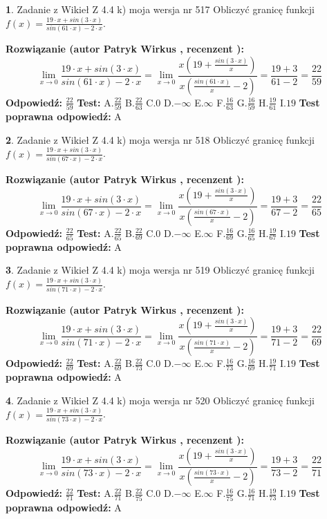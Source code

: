 \documentclass[12pt, a4paper]{article}
\theoremstyle{definition} %
\newtheorem{zad}{}
\newcommand{\zadStart}[1]{\begin{zad}#1\newline}
\newcommand{\zadStop}{\end{zad}}
\newcommand{\rozwStart}[2]{\noindent \textbf{Rozwiązanie (autor #1 , recenzent #2): }\newline}
\newcommand{\rozwStop}{\newline}
\newcommand{\odpStart}{\noindent \textbf{Odpowiedź:}\newline}
\newcommand{\odpStop}{\newline}
\newcommand{\testStart}{\noindent \textbf{Test:}\newline}
\newcommand{\testStop}{\newline}
\newcommand{\kluczStart}{\noindent \textbf{Test poprawna odpowiedź:}\newline}
\newcommand{\kluczStop}{\newline}
\begin{document}
\zadStart{Zadanie z Wikieł Z 4.4 k) moja wersja nr 517}
Obliczyć granicę funkcji $f(x)=\frac{19\cdot x +sin(3\cdot x)}{sin(61\cdot x) -2\cdot x}$.
\zadStop
\rozwStart{Patryk Wirkus}{}
$$\lim\limits_{x\to 0}\frac{19\cdot x +sin(3\cdot x)}{sin(61\cdot x) -2\cdot x}
=\lim\limits_{x\to 0}\frac{x(19+\frac{sin(3\cdot x)}{x})}{x(\frac{sin(61\cdot x)}{x}-2)}
=\frac{19+3}{61-2} = \frac{22}{59}$$
\rozwStop
\odpStart
$\frac{22}{59}$
\odpStop
\testStart
A.$\frac{22}{59}$
B.$\frac{22}{63}$
C.$0$
D.$-\infty$
E.$\infty$
F.$\frac{16}{63}$
G.$\frac{16}{59}$
H.$\frac{19}{61}$
I.$19$
\testStop
\kluczStart
A
\kluczStop



\zadStart{Zadanie z Wikieł Z 4.4 k) moja wersja nr 518}
Obliczyć granicę funkcji $f(x)=\frac{19\cdot x +sin(3\cdot x)}{sin(67\cdot x) -2\cdot x}$.
\zadStop
\rozwStart{Patryk Wirkus}{}
$$\lim\limits_{x\to 0}\frac{19\cdot x +sin(3\cdot x)}{sin(67\cdot x) -2\cdot x}
=\lim\limits_{x\to 0}\frac{x(19+\frac{sin(3\cdot x)}{x})}{x(\frac{sin(67\cdot x)}{x}-2)}
=\frac{19+3}{67-2} = \frac{22}{65}$$
\rozwStop
\odpStart
$\frac{22}{65}$
\odpStop
\testStart
A.$\frac{22}{65}$
B.$\frac{22}{69}$
C.$0$
D.$-\infty$
E.$\infty$
F.$\frac{16}{69}$
G.$\frac{16}{65}$
H.$\frac{19}{67}$
I.$19$
\testStop
\kluczStart
A
\kluczStop



\zadStart{Zadanie z Wikieł Z 4.4 k) moja wersja nr 519}
Obliczyć granicę funkcji $f(x)=\frac{19\cdot x +sin(3\cdot x)}{sin(71\cdot x) -2\cdot x}$.
\zadStop
\rozwStart{Patryk Wirkus}{}
$$\lim\limits_{x\to 0}\frac{19\cdot x +sin(3\cdot x)}{sin(71\cdot x) -2\cdot x}
=\lim\limits_{x\to 0}\frac{x(19+\frac{sin(3\cdot x)}{x})}{x(\frac{sin(71\cdot x)}{x}-2)}
=\frac{19+3}{71-2} = \frac{22}{69}$$
\rozwStop
\odpStart
$\frac{22}{69}$
\odpStop
\testStart
A.$\frac{22}{69}$
B.$\frac{22}{73}$
C.$0$
D.$-\infty$
E.$\infty$
F.$\frac{16}{73}$
G.$\frac{16}{69}$
H.$\frac{19}{71}$
I.$19$
\testStop
\kluczStart
A
\kluczStop



\zadStart{Zadanie z Wikieł Z 4.4 k) moja wersja nr 520}
Obliczyć granicę funkcji $f(x)=\frac{19\cdot x +sin(3\cdot x)}{sin(73\cdot x) -2\cdot x}$.
\zadStop
\rozwStart{Patryk Wirkus}{}
$$\lim\limits_{x\to 0}\frac{19\cdot x +sin(3\cdot x)}{sin(73\cdot x) -2\cdot x}
=\lim\limits_{x\to 0}\frac{x(19+\frac{sin(3\cdot x)}{x})}{x(\frac{sin(73\cdot x)}{x}-2)}
=\frac{19+3}{73-2} = \frac{22}{71}$$
\rozwStop
\odpStart
$\frac{22}{71}$
\odpStop
\testStart
A.$\frac{22}{71}$
B.$\frac{22}{75}$
C.$0$
D.$-\infty$
E.$\infty$
F.$\frac{16}{75}$
G.$\frac{16}{71}$
H.$\frac{19}{73}$
I.$19$
\testStop
\kluczStart
A
\kluczStop
\end{document}
